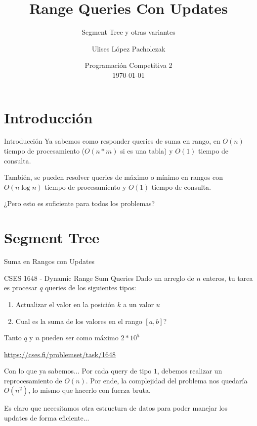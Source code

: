 \documentclass{beamer}
\title{Range Queries Con Updates}
\subtitle{Segment Tree y otras variantes}
\author{Ulises López Pacholczak}
\date[PC2]{Programación Competitiva 2\\\today}
\begin{document}
\begin{frame}
\titlepage
\end{frame}

\begin{frame}
\small
\tableofcontents[hideallsubsections]
\end{frame}

\section{Introducción}

\begin{frame}{Introducción}
Ya sabemos como responder queries de suma en rango, en $O(n)$ tiempo de procesamiento ($O(n*m)$ si es una tabla) y $O(1)$ tiempo de consulta.

\pause
También, se pueden resolver queries de máximo o mínimo en rangos con $O(n \log n)$ tiempo de procesamiento y $O(1)$ tiempo de consulta.

\pause
¿Pero esto es suficiente para todos los problemas?
\end{frame}

\section{Segment Tree}

\begin{frame}{Suma en Rangos con Updates}

\begin{block}{CSES 1648 - Dynamic Range Sum Queries}
Dado un arreglo de $n$ enteros, tu tarea es procesar $q$ queries de los siguientes tipos:
\begin{enumerate}
    \item Actualizar el valor en la posición $k$ a un valor $u$
    \item Cual es la suma de los valores en el rango $[a,b]$?
\end{enumerate}
Tanto $q$ y $n$ pueden ser como máximo $2*10^5$
\end{block}

\url{https://cses.fi/problemset/task/1648}
\end{frame}

\begin{frame}{Con lo que ya sabemos...}
Por cada query de tipo $1$, debemos realizar un reprocesamiento de $O(n)$. Por ende, la complejidad del problema nos quedaría $O(n^2)$, lo mismo que hacerlo con fuerza bruta.

\pause
Es claro que necesitamos otra estructura de datos para poder manejar los updates de forma eficiente...
\end{frame}
\end{document}
